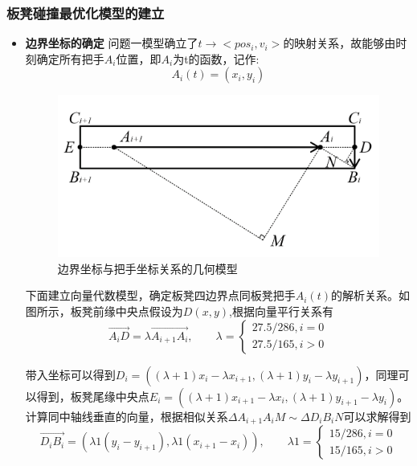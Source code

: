 \documentclass[a4paper]{article}
\begin{document}
        \subsubsection{板凳碰撞最优化模型的建立}
    \begin{itemize}
        \item {\textbf{边界坐标的确定}}
        问题一模型确立了$t\to<pos_i,v_i>$的映射关系，故能够由时刻确定所有把手$A_{i}$位置，即$A_{i}$为t的函数，记作:$$A_{i}(t) = (x_i, y_i)$$
        \begin{figure}[H]
            \centering
            \includegraphics[width=0.5\linewidth]{image/Figure_5211.png}
            \caption{边界坐标与把手坐标关系的几何模型}
            \label{fig:enter-label1}
        \end{figure}

        下面建立向量代数模型，确定板凳四边界点同板凳把手$A_i(t)$的解析关系。如图所示，板凳前缘中央点假设为$D(x,y)$,根据向量平行关系有
        $$
                   \overrightarrow{A_iD} = \lambda\overrightarrow{A_{i+1}A_i}
        ,\quad\quad \lambda = \left\{ \begin{array}{c}
              27.5 / 286, i = 0 \\
              27.5 / 165, i > 0

        \end{array}\right.
        $$

        带入坐标可以得到$D_i = ((\lambda + 1) x_{i} - \lambda x_{i + 1}, (\lambda + 1) y_{i} - \lambda y_{i + 1})$，同理可以得到，板凳尾缘中央点$E_i = ((\lambda + 1) x_{i + 1} - \lambda x_{i}, (\lambda + 1) y_{i + 1} - \lambda y_{i})$。
        计算同中轴线垂直的向量，根据相似关系$\Delta A_{i+ 1}A_iM \sim \Delta D_iB_iN$可以求解得到
        $$\overrightarrow{D_i B_i} = (\lambda 1 (y_i - y_{i + 1}), \lambda 1 (x_{i + 1} - x_i)),
        \quad \quad \lambda 1 = \left\{ \begin{array}{c}
             15/286, i = 0  \\
             15/165, i > 0
        \end{array}
        \right.$$


\end{itemize}
\end{document}
